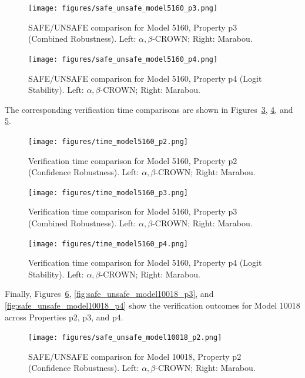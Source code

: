\begin{figure}[htbp]
    \centering
    \texttt{[image: figures/safe\_unsafe\_model5160\_p3.png]}
    \caption{SAFE/UNSAFE comparison for Model 5160, Property p3 (Combined Robustness). Left: $\alpha, \beta$-CROWN; Right: Marabou.}
    \label{fig:safe_unsafe_model5160_p3}
\end{figure}

\begin{figure}[htbp]
    \centering
    \texttt{[image: figures/safe\_unsafe\_model5160\_p4.png]}
    \caption{SAFE/UNSAFE comparison for Model 5160, Property p4 (Logit Stability). Left: $\alpha, \beta$-CROWN; Right: Marabou.}
    \label{fig:safe_unsafe_model5160_p4}
\end{figure}

The corresponding verification time comparisons are shown in Figures~\ref{fig:time_model5160_p2}, \ref{fig:time_model5160_p3}, and \ref{fig:time_model5160_p4}.

\begin{figure}[htbp]
    \centering
    \texttt{[image: figures/time\_model5160\_p2.png]}
    \caption{Verification time comparison for Model 5160, Property p2 (Confidence Robustness). Left: $\alpha, \beta$-CROWN; Right: Marabou.}
    \label{fig:time_model5160_p2}
\end{figure}

\begin{figure}[htbp]
    \centering
    \texttt{[image: figures/time\_model5160\_p3.png]}
    \caption{Verification time comparison for Model 5160, Property p3 (Combined Robustness). Left: $\alpha, \beta$-CROWN; Right: Marabou.}
    \label{fig:time_model5160_p3}
\end{figure}

\begin{figure}[htbp]
    \centering
    \texttt{[image: figures/time\_model5160\_p4.png]}
    \caption{Verification time comparison for Model 5160, Property p4 (Logit Stability). Left: $\alpha, \beta$-CROWN; Right: Marabou.}
    \label{fig:time_model5160_p4}
\end{figure}

Finally, Figures~\ref{fig:safe_unsafe_model10018_p2}, \ref{fig:safe_unsafe_model10018_p3}, and \ref{fig:safe_unsafe_model10018_p4} show the verification outcomes for Model 10018 across Properties p2, p3, and p4.

\begin{figure}[htbp]
    \centering
    \texttt{[image: figures/safe\_unsafe\_model10018\_p2.png]}
    \caption{SAFE/UNSAFE comparison for Model 10018, Property p2 (Confidence Robustness). Left: $\alpha, \beta$-CROWN; Right: Marabou.}
    \label{fig:safe_unsafe_model10018_p2}
\end{figure}

